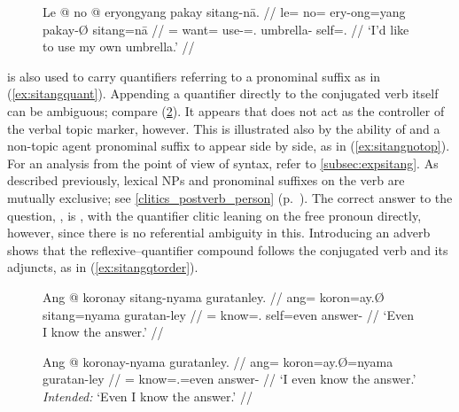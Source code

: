 \begin{figure}
\ex\label{ex:emphposs}%
\begingl
	\gla Le @ no @ eryongyang pakay sitang-nā. //
	\glb le= no= ery-ong=yang pakay-Ø sitang=nā //
	\glc \PatTI{}= want= use-\Irr{}=\Fsg{}.\Aarg{} umbrella-\Top{} 
		self=\Fsg{}.\Gen{} //
	\glft `I'd like to use my own umbrella.' //
\endgl\xe
\end{figure}

 is also used to carry quantifiers referring to a
pronominal suffix as in (\ref{ex:sitangquant}). Appending a quantifier directly
to the conjugated verb itself can be ambiguous; compare
(\ref{ex:nositangquant}). It appears that  does not act as
the controller of the verbal topic marker, however. This is illustrated also by
the ability of  and a non-topic agent pronominal suffix to
appear side by side, as in (\ref{ex:sitangnotop}). For an analysis from the
point of view of syntax, refer to \autoref{subsec:expsitang}. As described
previously, lexical NPs and pronominal suffixes on the verb are mutually
exclusive; see \autoref{clitics_postverb_person}
(p.~\pageref{clitics_postverb_person}). The correct answer to the question,
, is , with the quantifier clitic
leaning on the free pronoun directly, however, since there is no referential
ambiguity in this. Introducing an adverb shows that the reflexive--quantifier
compound follows the conjugated verb and its adjuncts, as in
(\ref{ex:sitangqtorder}).

\begin{figure}
\pex
\a\label{ex:sitangquant}\begingl
	\gla Ang @ koronay sitang-nyama guratanley. //
	\glb ang= koron=ay.Ø sitang=nyama guratan-ley //
	\glc \AgtT{}= know=\Fsg{}.\Top{} self=even answer-\PargI{} //
	\glft `Even I know the answer.' //
\endgl

\a\label{ex:nositangquant}\ljudge\excl\begingl
	\gla Ang @ koronay-nyama guratanley. //
	\glb ang= koron=ay.Ø=nyama guratan-ley //
	\glc \AgtT{}= know=\Fsg{}.\Top{}=even answer-\PargI{} //
	\glft `I even know the answer.' \\
		\textit{Intended:} `Even I know the answer.' //
\endgl
\xe
\end{figure}

